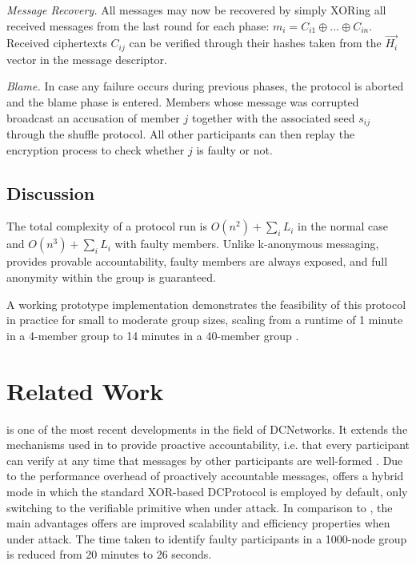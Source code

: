 \emph{Message Recovery.}
      All messages may now be recovered by simply XORing all received messages from the last round for each phase: $m_i = C_{i1} \oplus \ldots \oplus C_{in}$. Received ciphertexts $C_{ij}$ can be verified
      through their hashes taken from the $\vec{H_i}$ vector in the message descriptor.

\emph{Blame.}
      In case any failure occurs during previous phases, the protocol is aborted and the blame phase is entered.
      Members whose message was corrupted broadcast an accusation of member $j$ together with the
      associated seed $s_{ij}$ through the shuffle protocol.
      All other participants can then replay the encryption process to check whether $j$
      is faulty or not.

\subsection{Discussion}
The total complexity of a protocol run is $O(n^2) + \sum_i L_i$ in the normal case
and $O(n^3) + \sum_i L_i$ with faulty members. Unlike k-anonymous messaging,
\Dissent provides provable accountability, faulty members are always exposed, and full anonymity
within the group is guaranteed.

A working prototype implementation demonstrates the feasibility of this protocol in practice
for small to moderate group sizes, scaling from a runtime of 1 minute in a 4-member group
to 14 minutes in a 40-member group \cite{journals/corr/abs-1004-3057}.

\section{Related Work}

\Verdict is one of the most recent developments in the field of \acp{DCNetwork}.
It extends the mechanisms used in \Dissent to provide proactive accountability, i.e.
that every participant can verify at any time that messages by other participants are well-formed \cite{corrigan2013proactively}. Due to the performance overhead of proactively accountable messages,
\Verdict offers a hybrid mode in which the standard XOR-based \ac{DCProtocol}
is employed by default, only switching to the verifiable primitive when under attack.
In comparison to \Dissent, the main advantages \Verdict offers are 
improved scalability and efficiency properties when under attack. The time taken to
identify faulty participants in a 1000-node group is reduced from 20 minutes to 26 seconds.

